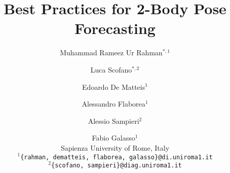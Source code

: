 \documentclass[10pt,twocolumn,letterpaper]{article}
\begin{document}
\title{Best Practices for 2-Body Pose Forecasting}





\author{Muhammad Rameez Ur Rahman$^{*, 1}$ \and Luca Scofano$^{*,2}$ \and Edoardo De Matteis$^1$ \and Alessandro Flaborea$^1$ \and Alessio Sampieri$^2$ \and Fabio Galasso$^1$ \\
Sapienza University of Rome, Italy \\
{\tt\small $^1$\{rahman, dematteis, flaborea, galasso\}@di.uniroma1.it} \\
{\tt\small $^2$\{scofano, sampieri\}@diag.uniroma1.it}
}

\maketitle
\begin{NoHyper}
    \def\thefootnote{*}
    \def\thefootnote{\arabic{footnote}}
\end{NoHyper}

\def\ckmk{\tikz\fill[scale=0.4](0,.35) -- (.25,0) -- (1,.7) -- (.25,.15) -- cycle;} 

\newcommand{\ls}[1]{\color{ForestGreen}#1}
\newcommand{\LS}[1]{{\color{ForestGreen}{\ls [Luca: #1]}}}

\newcommand{\ra}[1]{\color{BrickRed}#1}
\newcommand{\RA}[1]{{\color{BrickRed}{\ra [Rameez: #1]}}}

\newcommand{\ed}[1]{\color{Cerulean}#1}
\newcommand{\ED}[1]{{\color{Cerulean}{\ed [Edoardo: #1]}}}

\newcommand{\as}[1]{\color{blue}#1}
\newcommand{\AS}[1]{{\color{blue}{\as [Alessio: #1]}}}

\newcommand{\fg}[1]{\color{orange}#1}
\newcommand{\FG}[1]{{\color{orange}{\fg [Fabio: #1]}}}

\newcommand{\af}[1]{\color{purple}#1}
\newcommand{\AF}[1]{{\color{purple}{\af [AF: #1]}}}


\newcommand{\modelname}{IFS-GCN~}

\maketitle
\end{document}
